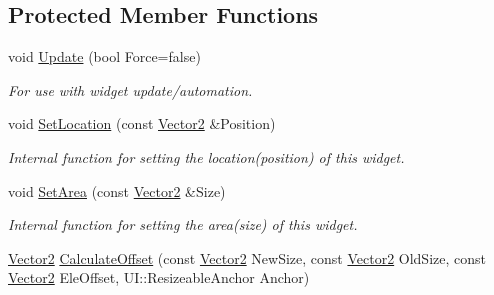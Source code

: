 \subsection*{Protected Member Functions}
\begin{DoxyCompactItemize}
\item 
\hypertarget{classphys_1_1UI_1_1Window_a867bbe36b9eb74e9fb306303258be5a4}{
void \hyperlink{classphys_1_1UI_1_1Window_a867bbe36b9eb74e9fb306303258be5a4}{Update} (bool Force=false)}
\label{d4/d86/classphys_1_1UI_1_1Window_a867bbe36b9eb74e9fb306303258be5a4}

\begin{DoxyCompactList}\small\item\em For use with widget update/automation. \item\end{DoxyCompactList}\item 
\hypertarget{classphys_1_1UI_1_1Window_a72f45126d1a8282f03054470c94218bf}{
void \hyperlink{classphys_1_1UI_1_1Window_a72f45126d1a8282f03054470c94218bf}{SetLocation} (const \hyperlink{classphys_1_1Vector2}{Vector2} \&Position)}
\label{d4/d86/classphys_1_1UI_1_1Window_a72f45126d1a8282f03054470c94218bf}

\begin{DoxyCompactList}\small\item\em Internal function for setting the location(position) of this widget. \item\end{DoxyCompactList}\item 
\hypertarget{classphys_1_1UI_1_1Window_ab0917b15904f30d66e6ef81b840601e2}{
void \hyperlink{classphys_1_1UI_1_1Window_ab0917b15904f30d66e6ef81b840601e2}{SetArea} (const \hyperlink{classphys_1_1Vector2}{Vector2} \&Size)}
\label{d4/d86/classphys_1_1UI_1_1Window_ab0917b15904f30d66e6ef81b840601e2}

\begin{DoxyCompactList}\small\item\em Internal function for setting the area(size) of this widget. \item\end{DoxyCompactList}\item 
\hypertarget{classphys_1_1UI_1_1Window_ae733d9dc3b0bc37c91dc7002c8b01bc7}{
\hyperlink{classphys_1_1Vector2}{Vector2} \hyperlink{classphys_1_1UI_1_1Window_ae733d9dc3b0bc37c91dc7002c8b01bc7}{CalculateOffset} (const \hyperlink{classphys_1_1Vector2}{Vector2} NewSize, const \hyperlink{classphys_1_1Vector2}{Vector2} OldSize, const \hyperlink{classphys_1_1Vector2}{Vector2} EleOffset, UI::ResizeableAnchor Anchor)}
\label{d4/d86/classphys_1_1UI_1_1Window_ae733d9dc3b0bc37c91dc7002c8b01bc7}


\end{DoxyCompactItemize}
